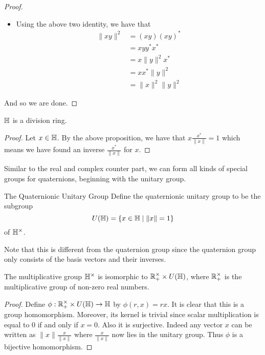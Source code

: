 \documentclass[a4paper]{article}
\begin{document}
\begin{prp}{}{}
\begin{proof}
\begin{itemize}
\begin{align*}
y^\ast x^\ast&=(a_2a_1+\vb{h}_2\cdot\vb{h}_1)+(-a_1\vb{h}_2-a_2\vb{h}_1+\vb{h}_2\times\vb{h}_1)\\
&=(a_2a_1+\vb{h}_2\cdot\vb{h}_1)-(a_1\vb{h}_2+a_2\vb{h}_1+\vb{h}_1\times\vb{h}_2)\\
&=(xy)^\ast
\end{align*}
by using the fact that $-\vb{x}\times\vb{y}=\vb{y}\times\vb{x}$. 
\item Using the above two identity, we have that 
\begin{align*}
\|xy\|^2&=(xy)(xy)^\ast\\
&=xyy^\ast x^\ast\\
&=x\|y\|^2 x^\ast\\
&=xx^\ast\|y\|^2\\
&=\|x\|^2\|y\|^2
\end{align*}
\end{itemize}
And so we are done. 
\end{proof}
\end{prp}

\begin{prp}{}{} $\mathbb{H}$ is a division ring. \tcbline
\begin{proof}
Let $x\in\mathbb{H}$. By the above proposition, we have that $x\frac{x^\ast}{\|x\|}=1$ which means we have found an inverse $\frac{x^\ast}{\|x\|}$ for $x$. 
\end{proof}
\end{prp}

Similar to the real and complex counter part, we can form all kinds of special groups for quaternions, beginning with the unitary group. 

\begin{defn}{The Quaternionic Unitary Group}{} Define the quaternionic unitary group to be the subgroup $$U(\mathbb{H})=\{x\in\mathbb{H}\;|\;\|x\|=1\}$$ of $\mathbb{H}^\times$. 
\end{defn}

Note that this is different from the quaternion group since the quaternion group only consists of the basis vectors and their inverses. 

\begin{prp}{}{} The multiplicative group $\mathbb{H}^\times$ is isomorphic to $\mathbb{R}_+^\times\times U(\mathbb{H})$, where $\mathbb{R}_+^\times$ is the multiplicative group of non-zero real numbers. \tcbline
\begin{proof}
Define $\phi:\mathbb{R}_+^\times\times U(\mathbb{H})\to\mathbb{H}$ by $\phi(r,x)=rx$. It is clear that this is a group homomorphism. Moreover, its kernel is trivial since scalar multiplication is equal to $0$ if and only if $x=0$. Also it is surjective. Indeed any vector $x$ can be written as $\|x\|\frac{x}{\|x\|}$ where $\frac{x}{\|x\|}$ now lies in the unitary group. Thus $\phi$ is a bijective homomorphism.  
\end{proof}
\end{prp}
\end{document}
